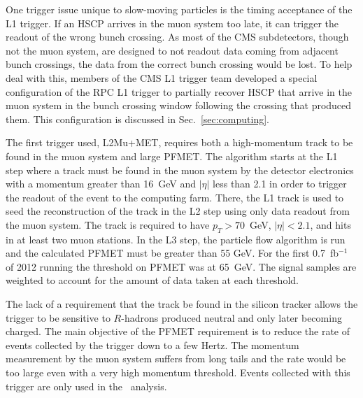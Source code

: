 One trigger issue unique to slow-moving particles is the timing acceptance of the L1 trigger. If an HSCP arrives in the muon system too late, it can trigger the
readout of the wrong bunch crossing. As most of the CMS subdetectors, though not the muon system, are designed to not readout data coming from adjacent bunch crossings,
the data from the correct bunch crossing would be lost. To help deal with this, members of the CMS L1 trigger team developed a special configuration of the
RPC L1 trigger to partially recover HSCP that arrive in the muon system in the bunch crossing window following the crossing that produced them.
This configuration is discussed in Sec.~\ref{sec:computing}.


The first trigger used, L2Mu+MET, requires both a high-momentum track to be found in the muon system and large PFMET.
The algorithm starts at the L1 step where a track must be found in the muon system by the detector electronics with a momentum greater than 16~GeV and $|\eta|$ less than 2.1 
in order to trigger the readout of the event to the computing farm.
There, the L1 track is used to seed the reconstruction of the track in the L2 step using only data readout from the muon system.
The track is required to have $p_T > 70$~GeV, $|\eta| < 2.1$, and hits in at least two muon stations.
In the L3 step, the particle flow algorithm is run and the calculated PFMET must be greater than 55 GeV.
For the first 0.7~fb$^{-1}$ of 2012 running the threshold on PFMET was at 65~GeV. The signal samples are weighted
to account for the amount of data taken at each threshold.

The lack of a requirement that the track be found in the silicon tracker allows the trigger to be sensitive to $R$-hadrons produced neutral and only later becoming charged.
The main objective of the PFMET requirement is to reduce the rate of events collected by the trigger
down to a few Hertz. The momentum measurement by the muon system suffers from long tails and the rate would be too large even with a very high momentum threshold.
Events collected with this trigger are only used in the \muononly\ analysis.

